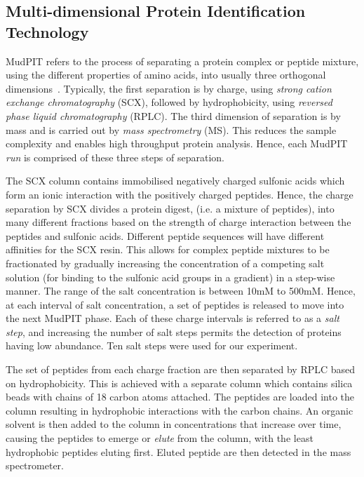 \documentclass[11pt,a4paper]{article}
\begin{document}
\subsection{Multi-dimensional Protein Identification Technology} \label{sec:MudPIT}
MudPIT refers to the process of separating a protein complex or peptide mixture, using the different properties of amino acids, into usually three orthogonal dimensions~\citep{Washburn2001}. Typically, the first separation is by charge, using \emph{strong cation exchange chromatography} (SCX), followed by hydrophobicity, using \emph{reversed phase liquid chromatography} (RPLC). The third dimension of separation is by mass and is carried out by \emph{mass spectrometry} (MS). This reduces the sample complexity and enables high throughput protein analysis. Hence, each  MudPIT \emph{run} is comprised of these three steps of separation.

The SCX column contains immobilised negatively charged sulfonic acids which form an ionic interaction with the positively charged peptides. Hence, the charge separation by SCX divides a protein digest, (i.e. a mixture of peptides), into many different fractions based on the strength of charge interaction between the peptides and sulfonic acids. Different peptide sequences will have different affinities for the SCX resin. This allows for complex peptide mixtures to be fractionated by gradually increasing the concentration of a competing salt solution (for binding to the sulfonic acid groups in a gradient) in a step-wise manner. The range of the salt concentration is between 10mM to 500mM. Hence, at each interval of salt concentration, a set of peptides is released to move into the next MudPIT phase. Each of these charge intervals is referred to as a \emph{salt step}, and increasing the number of salt steps permits the detection of proteins having low abundance. Ten salt steps were used for our experiment.

The set of peptides from each charge fraction are then separated by RPLC based on hydrophobicity. This is achieved with a separate column which contains silica beads with chains of 18 carbon atoms attached. The peptides are loaded into the column resulting in hydrophobic interactions with the carbon chains. An organic solvent is then added to the column in concentrations that increase over time, causing the peptides to emerge or \emph{elute} from the column, with the least hydrophobic peptides eluting first. Eluted peptide are then detected in the mass spectrometer.
\end{document}
